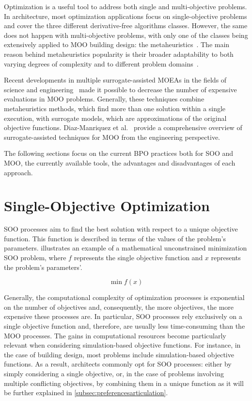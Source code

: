 	Optimization is a useful tool to address both single and multi-objective problems. In architecture, most optimization applications focus on single-objective problems and cover the three different derivative-free algorithms classes. However, the same does not happen with multi-objective problems, with only one of the classes being extensively applied to \ac{MOO} building design: the metaheuristics~\cite{Hamdy2016}. The main reason behind metaheuristics popularity is their broader adaptability to both varying degrees of complexity and to different problem domains~\cite{BlumRoli2003Metaheuristics}.
	
	Recent developments in multiple surrogate-assisted \acp{MOEA} in the fields of science and engineering~\cite{Zapotecas-Martinez2016,Hussein2016} made it possible to decrease the number of expensive evaluations in \ac{MOO} problems. Generally, these techniques combine metaheuristics methods, which find more than one solution within a single execution, with surrogate models, which are approximations of the original objective functions. Diaz-Manriquez et al.~\cite{Diaz-Manriquez2016} provide a comprehensive overview of surrogate-assisted techniques for \ac{MOO} from the engineering perspective. 

	The following sections focus on the current \ac{BPO} practices both for \ac{SOO} and \ac{MOO}, the currently available tools, the advantages and disadvantages of each approach.
	
\section{Single-Objective Optimization}
	
	\ac{SOO} processes aim to find the best solution with respect to a unique objective function. This function is described in terms of the values of the problem's parameters.  illustrates an example of a mathematical unconstrained minimization \ac{SOO} problem, where $f$ represents the single objective function and $x$ represents the problem's parameters'.
		
    \begin{equation} \label{eq:soo}
    	\min f(x) 
    \end{equation}

	Generally, the computational complexity of optimization processes is exponential on the number of objectives and, consequently, the more objectives, the more expensive these processes are. In particular, \ac{SOO} processes rely exclusively on a single objective function and, therefore, are usually less time-consuming than the \ac{MOO} processes. The gains in computational resources become particularly relevant when considering simulation-based objective functions. For instance, in the case of building design, most problems include simulation-based objective functions. As a result, architects commonly opt for \ac{SOO} processes: either by simply considering a single objective, or, in the case of problems involving multiple conflicting objectives, by combining them in a unique function as it will be further explained in \cref{subsec:preferencesarticulation}.
	
